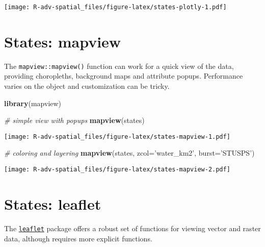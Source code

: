 \documentclass[]{book}
\newenvironment{Shaded}{\begin{snugshade}}{\end{snugshade}}
\newcommand{\KeywordTok}[1]{\textcolor[rgb]{0.13,0.29,0.53}{\textbf{{#1}}}}
\newcommand{\DataTypeTok}[1]{\textcolor[rgb]{0.13,0.29,0.53}{{#1}}}
\newcommand{\StringTok}[1]{\textcolor[rgb]{0.31,0.60,0.02}{{#1}}}
\newcommand{\CommentTok}[1]{\textcolor[rgb]{0.56,0.35,0.01}{\textit{{#1}}}}
\newcommand{\NormalTok}[1]{{#1}}
\theoremstyle{definition}
\theoremstyle{definition}
\theoremstyle{definition}
\theoremstyle{remark}
\begin{document}
\texttt{[image: R-adv-spatial\_files/figure-latex/states-plotly-1.pdf]}

\section{States: mapview}\label{states-mapview}

The \texttt{mapview::mapview()} function can work for a quick view of
the data, providing choropleths, background maps and attribute popups.
Performance varies on the object and customization can be tricky.

\begin{Shaded}
\begin{Highlighting}[]
\KeywordTok{library}\NormalTok{(mapview)}

\CommentTok{# simple view with popups}
\KeywordTok{mapview}\NormalTok{(states)}
\end{Highlighting}
\end{Shaded}

\texttt{[image: R-adv-spatial\_files/figure-latex/states-mapview-1.pdf]}

\begin{Shaded}
\begin{Highlighting}[]
\CommentTok{# coloring and layering}
\KeywordTok{mapview}\NormalTok{(states, }\DataTypeTok{zcol=}\StringTok{'water_km2'}\NormalTok{, }\DataTypeTok{burst=}\StringTok{'STUSPS'}\NormalTok{)}
\end{Highlighting}
\end{Shaded}

\texttt{[image: R-adv-spatial\_files/figure-latex/states-mapview-2.pdf]}

\section{States: leaflet}\label{states-leaflet}

The \href{http://rstudio.github.io/leaflet/}{\texttt{leaflet}} package
offers a robust set of functions for viewing vector and raster data,
although requires more explicit functions.

\begin{Shaded}
\end{Shaded}
\end{document}

